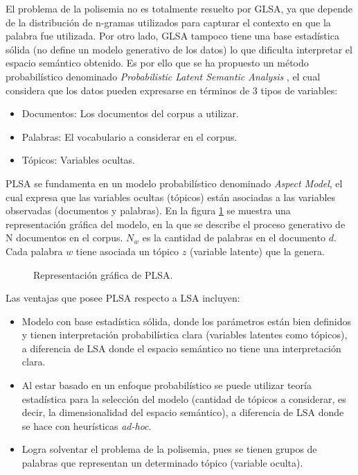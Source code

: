 \documentclass[12pt]{diicc}
\begin{document}
El problema de la polisemia no es totalmente resuelto por GLSA, ya que depende de la distribución de n-gramas utilizados para capturar el contexto en que la palabra fue utilizada. Por otro lado, GLSA tampoco tiene una base estadística sólida (no define un modelo generativo de los datos) lo que dificulta interpretar el espacio semántico obtenido. Es por ello que se ha propuesto un método probabilístico denominado {\em Probabilistic Latent Semantic Analysis} \cite{t41}, el cual considera que los datos pueden expresarse en términos de 3 tipos de variables:

\begin{itemize}
	\item Documentos: Los documentos del corpus a utilizar.
	\item Palabras: El vocabulario a considerar en el corpus.
	\item Tópicos: Variables ocultas.
\end{itemize}

PLSA se fundamenta en un modelo probabilístico denominado {\em Aspect Model}, el cual expresa que las variables ocultas (tópicos) están asociadas a las variables observadas (documentos y palabras). En la figura \ref{figura_plsa} se muestra una representación gráfica del modelo, en la que se describe el proceso generativo de N documentos en el corpus. $N_w$ es la cantidad de palabras en el documento $d$. Cada palabra $w$ tiene asociada un tópico $z$ (variable latente) que la genera.

\begin{figure}[!htbp]
  \begin{center}
    \leavevmode
  \end{center}
  \caption{Representación gráfica de PLSA.}
  \label{figura_plsa}
\end{figure}

Las ventajas que posee PLSA respecto a LSA incluyen:

\begin{itemize}
	\item Modelo con base estadística sólida, donde los parámetros están bien definidos y tienen interpretación probabilística clara (variables latentes como tópicos), a diferencia de LSA donde el espacio semántico no tiene una interpretación clara. 
	\item Al estar basado en un enfoque probabilístico se puede utilizar teoría estadística para la selección del modelo (cantidad de tópicos a considerar, es decir, la dimensionalidad del espacio semántico), a diferencia de LSA donde se hace con heurísticas {\em ad-hoc}.
	\item Logra solventar el problema de la polisemia, pues se tienen grupos de palabras que representan un determinado tópico (variable oculta).
\end{itemize}
\end{document}
